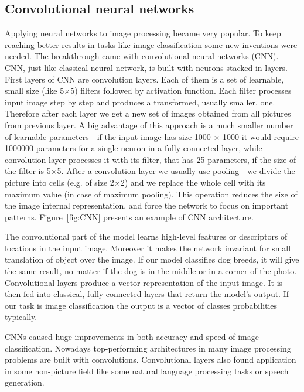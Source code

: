 \documentclass{article}
\begin{document}
\subsection{Convolutional neural networks}
Applying neural networks to image processing became very popular. To keep reaching better results in tasks like image classification some new inventions were needed. The breakthrough came with convolutional neural networks (CNN). CNN, just like classical neural network, is built with neurons stacked in layers. First layers of CNN are convolution layers. Each of them is a set of learnable, small size (like 5$\times$5) filters followed by activation function. Each filter processes input image step by step and produces a transformed, usually smaller, one. Therefore after each layer we get a new set of images obtained from all pictures from previous layer. A big advantage of this approach is a much smaller number of learnable parameters - if the input image has size 1000 $\times$ 1000 it would require 1000000 parameters for a single neuron in a fully connected layer, while convolution layer processes it with its filter, that has 25 parameters, if the size of the filter is 5$\times$5.  After a convolution layer we usually use pooling - we divide the picture into cells (e.g. of size 2$\times$2) and we replace the whole cell with its maximum value (in case of maximum pooling). This operation reduces the size of the image internal representation, and force the network to focus on important patterns. Figure~\ref{fig:CNN} presents an example of CNN architecture.
\par
The convolutional part of the model learns high-level features or descriptors of locations in the input image. Moreover it makes the network invariant for small translation of object over the image. If our model classifies dog breeds, it will give the same result, no matter if the dog is in the middle or in a corner of the photo. Convolutional layers produce a vector representation of the input image. It is then fed into classical, fully-connected layers that return the model's output. If our task is image classification the output is a vector of classes probabilities typically.
\par
CNNs caused huge improvements in both accuracy and speed of image classification. Nowadays top-performing architectures in many image processing problems are built with convolutions. Convolutional layers also found application in some non-picture field like some natural language processing tasks or speech generation. 
\end{document}
